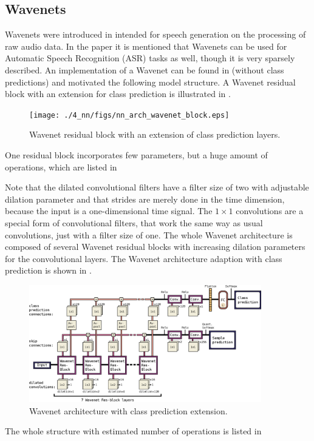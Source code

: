 \subsection{Wavenets}\label{sec:nn_arch_wavenet}
Wavenets were introduced in \cite{Oord2016} intended for speech generation on the processing of raw audio data.
In the paper it is mentioned that Wavenets can be used for Automatic Speech Recognition (ASR) tasks as well, though it is very sparsely described.
An implementation of a Wavenet can be found in \cite{Herrmann2018} (without class predictions) and motivated the following model structure.
A Wavenet residual block with an extension for class prediction is illustrated in .
\begin{figure}[!ht]
  \centering
    \texttt{[image: ./4\_nn/figs/nn\_arch\_wavenet\_block.eps]}
  \caption{Wavenet residual block \cite{Oord2016} with an extension of class prediction layers.}
  \label{fig:nn_arch_wavenet_block}
\end{figure}
\FloatBarrier
\noindent
One residual block incorporates few parameters, but a huge amount of operations, which are listed in 

Note that the dilated convolutional filters have a filter size of two with adjustable dilation parameter and that strides are merely done in the time dimension, because the input is a one-dimensional time signal.
The $1 \times 1$ convolutions are a special form of convolutional filters, that work the same way as usual convolutions, just with a filter size of one. 
The whole Wavenet architecture is composed of several Wavenet residual blocks with increasing dilation parameters for the convolutional layers.
The Wavenet architecture adaption with class prediction is shown in .
\begin{figure}[!ht]
  \centering
    \includegraphics[width=0.9\textwidth]{./4_nn/figs/nn_arch_wavenet_all.eps}
  \caption{Wavenet architecture with class prediction extension.}
  \label{fig:nn_arch_wavenet_all}
\end{figure}
\FloatBarrier
\noindent
The whole structure with estimated number of operations is listed in 


